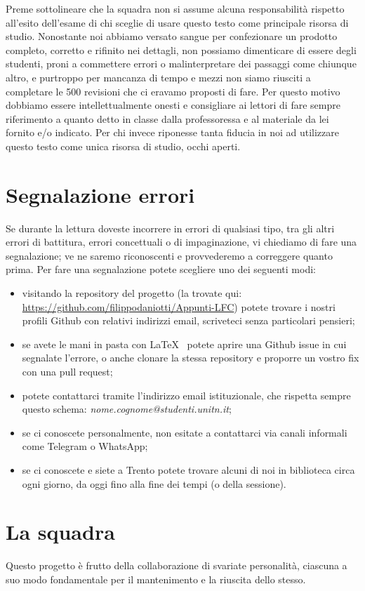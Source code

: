 \documentclass[class=book, crop=false, oneside, 12pt]{standalone}
\begin{document}
Preme sottolineare che la squadra non si assume alcuna responsabilità rispetto all'esito dell'esame di chi sceglie di usare questo testo come principale risorsa di studio. Nonostante noi abbiamo versato sangue per confezionare un prodotto completo, corretto e rifinito nei dettagli, non possiamo dimenticare di essere degli studenti, proni a commettere errori o malinterpretare dei passaggi come chiunque altro, e purtroppo per mancanza di tempo e mezzi non siamo riusciti a completare le 500 revisioni che ci eravamo proposti di fare. Per questo motivo dobbiamo essere intellettualmente onesti e consigliare ai lettori di fare sempre riferimento a quanto detto in classe dalla professoressa e al materiale da lei fornito e/o indicato. Per chi invece riponesse tanta fiducia in noi ad utilizzare questo testo come unica risorsa di studio, occhi aperti.

\section*{Segnalazione errori}
Se durante la lettura doveste incorrere in errori di qualsiasi tipo, tra gli altri errori di battitura, errori concettuali o di impaginazione, vi chiediamo di fare una segnalazione; ve ne saremo riconoscenti e provvederemo a correggere quanto prima. Per fare una segnalazione potete scegliere uno dei seguenti modi:
\begin{itemize}
    \item visitando la repository del progetto (la trovate qui: \url{https://github.com/filippodaniotti/Appunti-LFC}) potete trovare i nostri profili Github con relativi indirizzi email, scriveteci senza particolari pensieri;
    \item se avete le mani in pasta con \LaTeX~ potete aprire una Github issue in cui segnalate l'errore, o anche clonare la stessa repository e proporre un vostro fix con una pull request;
    \item potete contattarci tramite l'indirizzo email istituzionale, che rispetta sempre questo schema: \textit{nome.cognome@studenti.unitn.it};
    \item se ci conoscete personalmente, non esitate a contattarci via canali informali come Telegram o WhatsApp;
    \item se ci conoscete e siete a Trento potete trovare alcuni di noi in biblioteca circa ogni giorno, da oggi fino alla fine dei tempi (o della sessione).
\end{itemize}

\section*{La squadra}
Questo progetto è frutto della collaborazione di svariate personalità, ciascuna a suo modo fondamentale per il mantenimento e la riuscita dello stesso.
\end{document}
